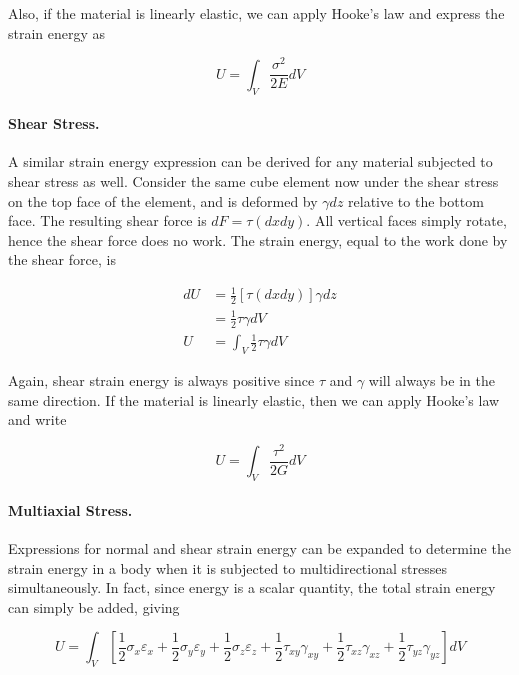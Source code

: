\documentclass[
fontsize=10pt,
a4paper,
twosides=false,
open=any,
svgnames,
]{kaobook} %
\begin{document}
Also, if the material is linearly elastic, we can apply Hooke's law and express the strain energy as

\begin{equation}
  U = \int_V \frac{\sigma^2}{2E} dV
\end{equation}

\paragraph{Shear Stress.}

A similar strain energy expression can be derived for any material subjected to shear stress as well. Consider the same cube element now under the shear stress on the top face of the element, and is deformed by $\gamma dz$ relative to the bottom face. The resulting shear force is $dF = \tau (dx dy)$. All vertical faces simply rotate, hence the shear force does no work. The strain energy, equal to the work done by the shear force, is

\begin{align}
  dU &= \frac{1}{2} \left[ \tau (dx dy) \right] \gamma dz \nonumber \\
     &= \frac{1}{2} \tau \gamma dV \nonumber \\
  U &= \int_V \frac{1}{2} \tau \gamma dV
\end{align}

Again, shear strain energy is always positive since $\tau$ and $\gamma$ will always be in the same direction. If the material is linearly elastic, then we can apply Hooke's law and write

\begin{equation}
  U = \int_V \frac{\tau^2}{2G} dV
\end{equation}

\paragraph{Multiaxial Stress.}

Expressions for normal and shear strain energy can be expanded to determine the strain energy in a body when it is subjected to multidirectional stresses simultaneously. In fact, since energy is a scalar quantity, the total strain energy can simply be added, giving

\begin{equation}
  U = \int_V \left[ \frac{1}{2}\sigma_x \varepsilon_x + \frac{1}{2}\sigma_y \varepsilon_y + \frac{1}{2}\sigma_z \varepsilon_z + \frac{1}{2}\tau_{xy} \gamma_{xy} + \frac{1}{2}\tau_{xz} \gamma_{xz} + \frac{1}{2}\tau_{yz} \gamma_{yz}\right] dV
\end{equation}
\end{document}
